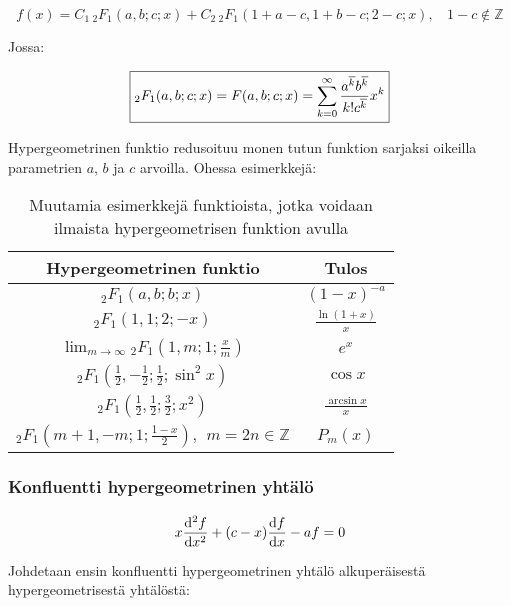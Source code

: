 \documentclass[../johdoksia.tex]{subfiles}
\begin{document}
	\begin{equation}
		\boxed{f(x) = C_1\,{_2{F}_1}(a, b; c; x) + C_2\,{_2{F}_1}(1 + a - c, 1 + b - c; 2 - c; x), \ \ \ \ 1 - c \notin\mathbb{Z}}
	\end{equation}

	Jossa:
	
	\begin{equation}
		\boxed{{_2{F}_1}(a, b; c; x) = F(a, b; c; x) = \sum_{k = 0}^{\infty}\frac{a^{\overline{k}}b^{\overline{k}}}{k!c^{\overline{k}}}x^{k}}
	\end{equation}

	Hypergeometrinen funktio redusoituu monen tutun funktion sarjaksi oikeilla parametrien $a$, $b$ ja $c$ arvoilla. Ohessa esimerkkejä:
	
	\begin{table}[h!]
		\centering
		\renewcommand{\arraystretch}{1.5}
		\begin{tabular}{|c|c|}
			\hline
			Hypergeometrinen funktio & Tulos \\
			\hline
			${_2{F}_1}(a, b; b; x)$ & $(1 - x)^{-a}$ \\
			\hline
			${_2{F}_1}(1, 1; 2; -x)$ & $\frac{\ln(1 + x)}{x}$ \\
			\hline
			$\lim_{m\to\infty}{_2{F}_1}\left(1, m; 1; \frac{x}{m}\right)$ & $e^{x}$ \\
			\hline
			${_2{F}_1}\left(\frac{1}{2}, -\frac{1}{2}; \frac{1}{2}; \sin^2x\right)$ & $\cos x$ \\
			\hline
			${_2{F}_1}\left(\frac{1}{2}, \frac{1}{2}; \frac{3}{2}; x^2\right)$ & $\frac{\arcsin x}{x}$ \\
			\hline
			${_2{F}_1}\left(m + 1, -m; 1; \frac{1 - x}{2}\right), \ \ m = 2n \in\mathbb{Z}$ & $P_{m}(x)$ \\
			\hline
		\end{tabular}
		\caption{Muutamia esimerkkejä funktioista, jotka voidaan ilmaista hypergeometrisen funktion avulla}
	\end{table}
	
	
	\subsubsection{Konfluentti hypergeometrinen yhtälö}
	
	\begin{equation}
		x\odv{^2f}{x^2} + (c - x)\odv{f}{x} - af = 0
	\end{equation}

	Johdetaan ensin konfluentti hypergeometrinen yhtälö alkuperäisestä hypergeometrisestä yhtälöstä:
	
\end{document}
